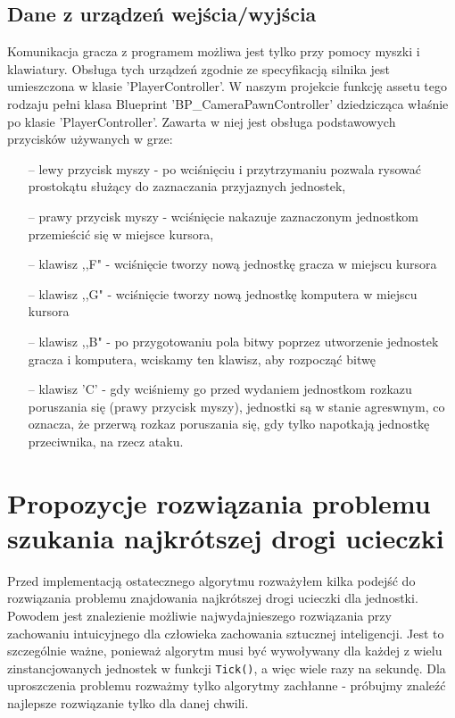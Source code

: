\documentclass[12pt]{report}
\begin{document}
\subsection{Dane z urządzeń wejścia/wyjścia}
Komunikacja gracza z programem możliwa jest tylko przy pomocy myszki i klawiatury. Obsługa tych urządzeń zgodnie ze specyfikacją silnika jest umieszczona w klasie 'PlayerController'. W naszym projekcie funkcję assetu tego rodzaju pełni klasa Blueprint 'BP\_CameraPawnController' dziedzicząca właśnie po klasie 'PlayerController'. Zawarta w niej jest obsługa podstawowych przycisków używanych w grze: 

\begin{itemize}
\item[--] lewy przycisk myszy - po wciśnięciu i przytrzymaniu pozwala rysować prostokątu służący do zaznaczania przyjaznych jednostek,
\item[--] prawy przycisk myszy - wciśnięcie nakazuje zaznaczonym jednostkom przemieścić się w miejsce kursora,
\item[--] klawisz ,,F" - wciśnięcie tworzy nową jednostkę gracza w miejscu kursora
\item[--] klawisz ,,G" - wciśnięcie tworzy nową jednostkę komputera w miejscu kursora
\item[--] klawisz ,,B" - po przygotowaniu pola bitwy poprzez utworzenie jednostek gracza i komputera, wciskamy ten klawisz, aby rozpocząć bitwę
\item[--] klawisz 'C' - gdy wciśniemy go przed wydaniem jednostkom rozkazu poruszania się (prawy przycisk myszy), jednostki są w stanie agreswnym, co oznacza, że przerwą rozkaz poruszania się, gdy tylko napotkają jednostkę przeciwnika, na rzecz ataku.
\end{itemize}
\section{Propozycje rozwiązania problemu szukania najkrótszej drogi ucieczki}

Przed implementacją ostatecznego algorytmu rozważyłem kilka podejść do rozwiązania problemu znajdowania najkrótszej drogi ucieczki dla jednostki. Powodem jest znalezienie możliwie najwydajnieszego rozwiązania przy zachowaniu intuicyjnego dla człowieka zachowania sztucznej inteligencji. Jest to szczególnie ważne, ponieważ algorytm musi być wywoływany dla każdej z wielu zinstancjowanych jednostek w funkcji \texttt{\texttt{Tick}()}, a więc wiele razy na sekundę. Dla uproszczenia problemu rozważmy tylko algorytmy zachłanne - próbujmy znaleźć najlepsze rozwiązanie tylko dla danej chwili.
\end{document}
